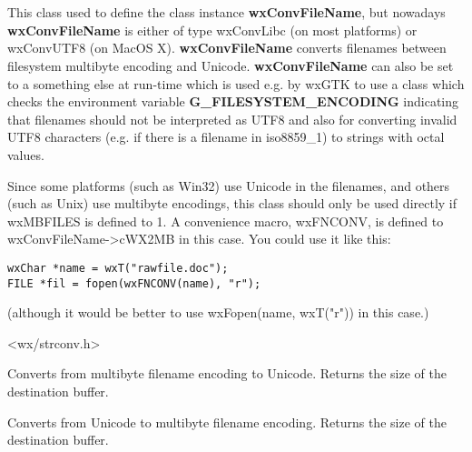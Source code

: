 \section{}\label{wxmbconvfile}

This class used to define the class instance 
{\bf wxConvFileName}, but nowadays {\bf wxConvFileName} is
either of type wxConvLibc (on most platforms) or wxConvUTF8
(on MacOS X). {\bf wxConvFileName} converts filenames between 
filesystem multibyte encoding and Unicode. {\bf wxConvFileName} 
can also be set to a something else at run-time which is used 
e.g. by wxGTK to use a class which checks the environment 
variable {\bf G\_FILESYSTEM\_ENCODING} indicating that filenames 
should not be interpreted as UTF8 and also for converting 
invalid UTF8 characters (e.g. if there is a filename in iso8859\_1)
to strings with octal values. 

Since some platforms (such as Win32) use Unicode in the filenames,
and others (such as Unix) use multibyte encodings, this class should only
be used directly if wxMBFILES is defined to 1. A convenience macro,
wxFNCONV, is defined to wxConvFileName->cWX2MB in this case. You could
use it like this:

\begin{verbatim}
wxChar *name = wxT("rawfile.doc");
FILE *fil = fopen(wxFNCONV(name), "r");
\end{verbatim}

(although it would be better to use wxFopen(name, wxT("r")) in this case.)




<wx/strconv.h>





\label{wxmbconvfilemb2wc}


Converts from multibyte filename encoding to Unicode. Returns the size of the destination buffer.

\label{wxmbconvfilewc2mb}


Converts from Unicode to multibyte filename encoding. Returns the size of the destination buffer.

